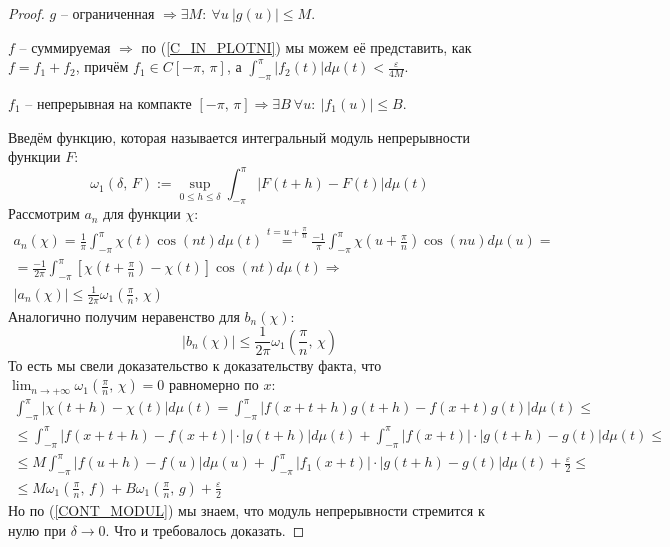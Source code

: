 \documentclass[a4paper,12pt]{article}
\renewcommand{\leq}{\ensuremath{\leqslant}}
\theoremstyle{plain}
\theoremstyle{definition}
\theoremstyle{remark}
\begin{document}
\begin{proof}
	$g$ -- ограниченная $\Rightarrow \exists M:\: \forall u \: |g(u)| \leq M$.

	$f$ -- суммируемая $\Rightarrow$ по (\ref{C_IN_PLOTNI}) мы можем её представить, как $f = f_1 + f_2$, причём $f_1 \in C[-\pi,\,\pi]$, а $\int_{-\pi}^{\pi} |f_2(t)|d\mu(t) < \frac{\varepsilon}{4M}$.

	$f_1$ -- непрерывная на компакте $[-\pi,\,\pi] \Rightarrow \exists B \: \forall u:\: |f_1(u)| \leq B$.

	Введём функцию, которая называется интегральный модуль непрерывности функции $F$:
	\[\omega_1(\delta,\,F) := \sup_{0 \leq h \leq \delta} \int_{-\pi}^\pi |F(t + h) - F(t)|d\mu(t)\]
	Рассмотрим $a_n$ для функции $\chi$:
	\begin{align*}
		a_n(\chi) = \frac{1}{\pi} \int_{-\pi}^\pi \chi(t)\cos(nt)d\mu(t) \stackrel{t = u + \frac{\pi}{n}}{=} \frac{-1}{\pi}\int_{-\pi}^\pi \chi\left(u + \frac{\pi}{n}\right)\cos(nu)d\mu(u) = \\
		= \frac{-1}{2\pi}\int_{-\pi}^\pi \left[\chi\left(t + \frac{\pi}{n}\right) - \chi(t)\right]\cos(nt)d\mu(t) \Rightarrow                                                                    \\
		|a_n(\chi)| \leq \frac{1}{2\pi}\omega_1\left(\frac{\pi}{n},\, \chi\right)
	\end{align*}
	Аналогично получим неравенство для $b_n(\chi)$:
	\[|b_n(\chi)| \leq \frac{1}{2\pi}\omega_1\left(\frac{\pi}{n},\,\chi\right)\]
	То есть мы свели доказательство к доказательству факта, что $\lim_{n \to +\infty}\omega_1(\frac{\pi}{n},\,\chi) = 0$ равномерно по $x$:
	\begin{align*}
		\int_{-\pi}^\pi |\chi(t + h) - \chi(t)|d\mu(t) = \int_{-\pi}^\pi |f(x + t + h)g(t + h) - f(x + t)g(t)|d\mu(t) \leq                        \\
		\leq \int_{-\pi}^\pi |f(x + t + h) - f(x + t)|\cdot |g (t + h)|d\mu(t) + \int_{-\pi}^\pi |f(x + t)|\cdot |g(t + h) - g(t)|d\mu(t) \leq    \\
		\leq M \int_{-\pi}^\pi |f(u + h) - f(u)|d\mu(u) +  \int_{-\pi}^\pi |f_1(x + t)|\cdot|g(t + h) - g(t)|d\mu(t) + \frac{\varepsilon}{2} \leq \\
		\leq M \omega_1(\frac{\pi}{n},\, f) + B\omega_1(\frac{\pi}{n},\,g) + \frac{\varepsilon}{2}
	\end{align*}
	Но по (\ref{CONT_MODUL}) мы знаем, что модуль непрерывности стремится к нулю при $\delta \to 0$. Что и требовалось доказать.
\end{proof}
\end{document}
